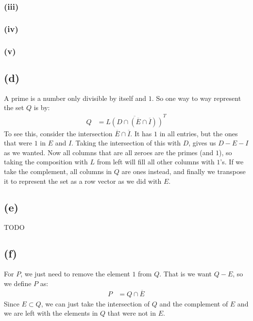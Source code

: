 \documentclass[a4paper, fleqn]{article}
\begin{document}
\subsubsection{(iii)}
\subsubsection{(iv)}
\subsubsection{(v)}

\subsection{(d)}
A prime is a number only divisible by itself and $1$. So one way to way represent the set
$Q$ is by:
\begin{align*}
  Q &= \overline{L\left(D\cap \left(\overline{E}\cap \overline{I}\right)\right)}^T
\end{align*}
To see this, consider the intersection $\overline{E}\cap \overline{I}$. It has $1$ in all
entries, but the ones that were $1$ in $E$ and $I$. Taking the intersection of this with
$D$, gives us $D-E-I$ as we wanted. Now all columns that are all zeroes are the primes
(and $1$), so taking the composition with $L$ from left will fill all other columns with
$1$'s. If we take the complement, all columns in $Q$ are ones instead, and finally we transpose it to represent the set as a row vector as we did with $E$.

\subsection{(e)}
TODO

\subsection{(f)}
For $P$, we just need to remove the element $1$ from $Q$. That is we want $Q-E$, so we
define $P$ as:
\begin{align*}
  P&=Q\cap \overline{E}
\end{align*}
Since $E\subset Q$, we can just take the intersection of $Q$  and the complement of $E$
and we are left with the elements in $Q$ that were not in $E$.
\end{document}
